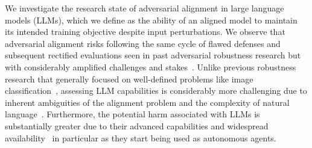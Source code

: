 We investigate the research state of adversarial alignment in large language models (LLMs), which we define as the ability of an aligned model to maintain its intended training objective despite input perturbations. %
We observe that adversarial alignment risks following the same cycle of flawed defenses and subsequent rectified evaluations seen in past adversarial robustness research but with considerably amplified challenges and stakes~\cite{hendrycks2022x, zou2023universal, schwinn2023adversarial}. 
Unlike previous robustness research that generally focused on well-defined problems like image classification~\cite{goodfellow_explaining_2015}, assessing LLM capabilities is considerably more challenging due to inherent ambiguities of the alignment problem and the complexity of natural language~\cite{wolf2023fundamental, andriushchenko2024jailbreaking, li2024llm}. Furthermore, the potential harm associated with LLMs is substantially greater due to their advanced capabilities and widespread availability~\cite{hendrycks2022x} in particular as they start being used as autonomous agents.  %



